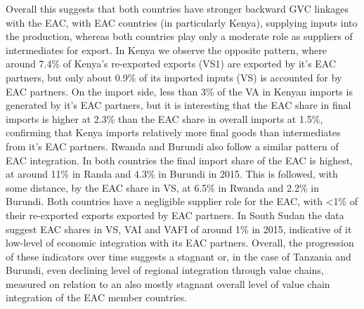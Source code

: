 \documentclass[a4paper]{article}
\begin{document}
Overall this suggests that both countries have stronger backward GVC linkages with the EAC, with EAC countries (in particularly Kenya), supplying inputs into the production, whereas both countries play only a moderate role as suppliers of intermediates for export. In Kenya we observe the opposite pattern, where around 7.4\% of Kenya's re-exported exports (VS1) are exported by it's EAC partners, but only about 0.9\% of its imported inputs (VS) is accounted for by EAC partners. On the import side, less than 3\% of the VA in Kenyan imports is generated by it's EAC partners, but it is interesting that the EAC share in final imports is higher at 2.3\% than the EAC share in overall imports at 1.5\%, confirming that Kenya imports relatively more final goods than intermediates from it's EAC partners. Rwanda and Burundi also follow a similar pattern of EAC integration. In both countries the final import share of the EAC is highest, at around 11\% in Randa and 4.3\% in Burundi in 2015. This is followed, with some distance, by the EAC share in VS, at 6.5\% in Rwanda and 2.2\% in Burundi. Both countries have a negligible supplier role for the EAC, with <1\% of their re-exported exports exported by EAC partners. In South Sudan the data suggest EAC shares in VS, VAI and VAFI of around 1\% in 2015, indicative of it low-level of economic integration with its EAC partners. Overall, the progression of these indicators over time suggests a stagnant or, in the case of Tanzania and Burundi, even declining level of regional integration through value chains, measured on relation to an also mostly stagnant overall level of value chain integration of the EAC member countries. 




\end{document}
